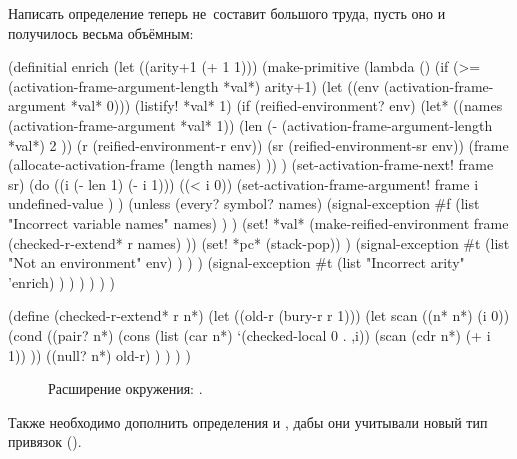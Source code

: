 Написать определение  теперь не~составит большого труда, пусть оно и
получилось весьма объёмным:

\begin{code:lisp}
(definitial enrich
  (let ((arity+1 (+ 1 1)))
    (make-primitive
     (lambda ()
       (if (>= (activation-frame-argument-length *val*) arity+1)
         (let ((env (activation-frame-argument *val* 0)))
           (listify! *val* 1)
           (if (reified-environment? env)
             (let* ((names (activation-frame-argument *val* 1))
                    (len (- (activation-frame-argument-length *val*)
                            2 ))
                    (r (reified-environment-r env))
                    (sr (reified-environment-sr env))
                    (frame (allocate-activation-frame
                            (length names) )) )
               (set-activation-frame-next! frame sr)
               (do ((i (- len 1) (- i 1)))
                   ((< i 0))
                 (set-activation-frame-argument! frame i
                                                 undefined-value ) )
               (unless (every? symbol? names)
                 (signal-exception
                  #f (list "Incorrect variable names" names) ) )
               (set! *val* (make-reified-environment frame
                            (checked-r-extend* r names) ))
               (set! *pc* (stack-pop)) )
             (signal-exception
              #t (list "Not an environment" env) ) ) )
         (signal-exception
          #t (list "Incorrect arity" 'enrich) ) ) ) ) ) )

(define (checked-r-extend* r n*)
  (let ((old-r (bury-r r 1)))
    (let scan ((n* n*) (i 0))
      (cond ((pair? n*) (cons (list (car n*) `(checked-local 0 . ,i))
                              (scan (cdr n*) (+ i 1)) ))
            ((null? n*) old-r) ) ) ) )
\end{code:lisp}

\begin{figure}\centering

\caption{Расширение окружения: \protect{}.}%
\label{reflection/reify-env/enrich/pic:subj}%
\end{figure}

Также необходимо дополнить определения  и
, дабы они учитывали новый тип привязок
().

